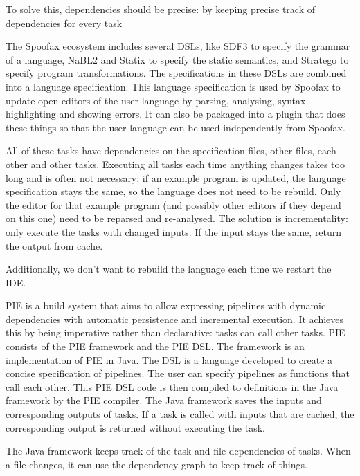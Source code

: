 To solve this, dependencies should be precise: by keeping precise track of dependencies for every task





The Spoofax ecosystem includes several DSLs, like SDF3 to specify the grammar of a language, NaBL2 and Statix to specify the static semantics, and Stratego to specify program transformations. 
The specifications in these DSLs are combined into a language specification.
This language specification is used by Spoofax to update open editors of the user language by parsing, analysing, syntax highlighting and showing errors.
It can also be packaged into a plugin that does these things so that the user language can be used independently from Spoofax.

All of these tasks have dependencies on the specification files, other files, each other and other tasks.
Executing all tasks each time anything changes takes too long and is often not necessary: if an example program is updated, the language specification stays the same, so the language does not need to be rebuild.
Only the editor for that example program (and possibly other editors if they depend on this one) need to be reparsed and re-analysed.
The solution is incrementality: only execute the tasks with changed inputs.
If the input stays the same, return the output from cache.

Additionally, we don't want to rebuild the language each time we restart the IDE.


\Ac{PIE} is a build system that aims to allow expressing pipelines with dynamic dependencies with automatic persistence and incremental execution.
It achieves this by being imperative rather than declarative: tasks can call other tasks.
\Ac{PIE} consists of the PIE framework and the \ac{PIE} \ac{DSL}.
The framework is an implementation of \ac{PIE} in Java.
The \ac{DSL} is a language developed to create a concise specification of pipelines.
The user can specify pipelines as functions that call each other.
This \ac{PIE} \ac{DSL} code is then compiled to definitions in the Java framework by the \ac{PIE} compiler.
The Java framework saves the inputs and corresponding outputs of tasks.
If a task is called with inputs that are cached, the corresponding output is returned without executing the task.

The Java framework keeps track of the task and file dependencies of tasks.
When a file changes, it can use the dependency graph to keep track of things.

